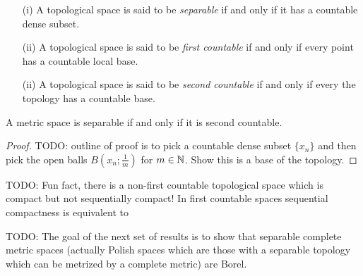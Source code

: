 \begin{defn}
\begin{itemize}
\item[(i)]A topological space is said to be \emph{separable} if and
  only if it has a countable dense subset.
\item[(ii)]A topological space is said to be \emph{first countable} if and
  only if every point has a countable local base.
\item[(ii)]A topological space is said to be \emph{second countable} if and
  only if every the topology has a countable base.
\end{itemize}
\end{defn}
\begin{lem}A metric space is separable if and only if it is second countable.
\end{lem}
\begin{proof}
TODO:
outline of proof is to pick a countable dense subset $\lbrace x_n
\rbrace$ and then pick the open balls $B(x_n; \frac{1}{m})$ for $m \in
\mathbb{N}$.  Show this is a base of the topology.
\end{proof}

TODO:  Fun fact, there is a non-first countable topological space
which is compact but not sequentially compact!  In first countable
spaces sequential compactness is equivalent to 

TODO: The goal of the next set of results is to show that separable
complete metric spaces (actually Polish spaces which are those with
a separable topology which can be metrized by a complete metric) are Borel.


